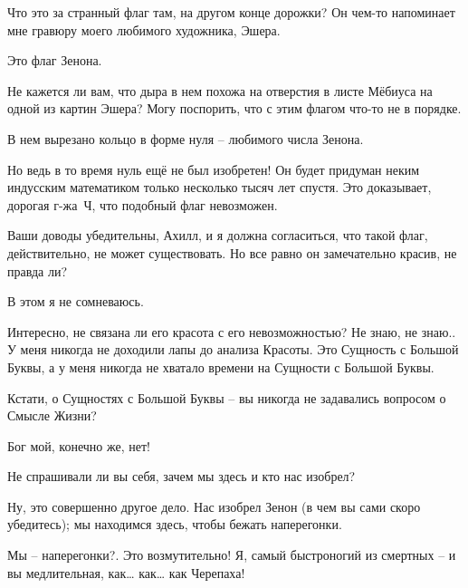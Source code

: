 \documentclass[../main.tex]{subfiles}
\begin{document}


\begin{dialogue}

 Что это за странный флаг там, на другом конце дорожки? Он чем-то напоминает мне гравюру моего любимого художника, Эшера.

 Это флаг Зенона.

 Не кажется ли вам, что дыра в нем похожа на отверстия в листе Мёбиуса на одной из картин Эшера? Могу поспорить, что с этим флагом что-то не в порядке.

 В нем вырезано кольцо в форме нуля \--- любимого числа Зенона.

 Но ведь в то время нуль ещё не был изобретен! Он будет придуман неким индусским математиком только несколько тысяч лет спустя. Это доказывает, дорогая г-жа~Ч, что подобный флаг невозможен.

 Ваши доводы убедительны, Ахилл, и я должна согласиться, что такой флаг, действительно, не может существовать. Но все равно он замечательно красив, не правда ли?

 В этом я не сомневаюсь.

 Интересно, не связана ли его красота с его невозможностью? Не знаю, не знаю.. У меня никогда не доходили лапы до анализа Красоты. Это Сущность с Большой Буквы, а у меня никогда не хватало времени на Сущности с Большой Буквы.

 Кстати, о Сущностях с Большой Буквы \--- вы никогда не задавались вопросом о Смысле Жизни?

 Бог мой, конечно же, нет!

 Не спрашивали ли вы себя, зачем мы здесь и кто нас изобрел?

 Ну, это совершенно другое дело. Нас изобрел Зенон (в чем вы сами скоро убедитесь); мы находимся здесь, чтобы бежать наперегонки.

 Мы \--- наперегонки?. Это возмутительно! Я, самый быстроногий из смертных \--- и вы медлительная, как\ldots{} как\ldots{} как Черепаха!


\end{dialogue}
\end{document}
